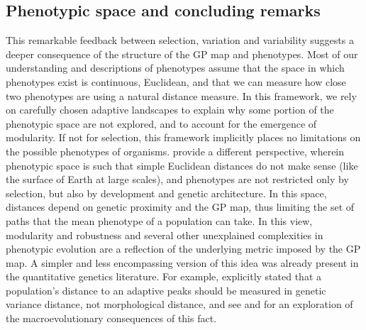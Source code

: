 \begin{refsection}
\subsection{Phenotypic space and concluding
remarks}\label{phenotypic-space-and-concluding-remarks}

This remarkable feedback between selection, variation and variability
suggests a deeper consequence of the structure of the GP map and
phenotypes. Most of our understanding and descriptions of phenotypes
assume that the space in which phenotypes exist is continuous,
Euclidean, and that we can measure how close two phenotypes are using a
natural distance measure. In this framework, we rely on carefully chosen
adaptive landscapes to explain why some portion of the phenotypic space
are not explored, and to account for the emergence of modularity. If not
for selection, this framework implicitly places no limitations on the
possible phenotypes of organisms. \textcite{Stadler2001-vt} provide a different
perspective, wherein phenotypic space is such that simple Euclidean
distances do not make sense (like the surface of Earth at large scales),
and phenotypes are not restricted only by selection, but also by
development and genetic architecture. In this space, distances depend on
genetic proximity and the GP map, thus limiting the set of paths that
the mean phenotype of a population can take. In this view, modularity
and robustness and several other unexplained complexities in phenotypic
evolution are a reflection of the underlying metric imposed by the GP
map. A simpler and less encompassing version of this idea was already
present in the quantitative genetics literature. For example,
\textcite{Lande1979-by} explicitly stated that a population's distance to an
adaptive peaks should be measured in genetic variance distance, not
morphological distance, and see \textcite{Steppan2002-be} and \textcite{Melo2016-yw} for an
exploration of the macroevolutionary consequences of this fact.

\printbibliography
\end{refsection}